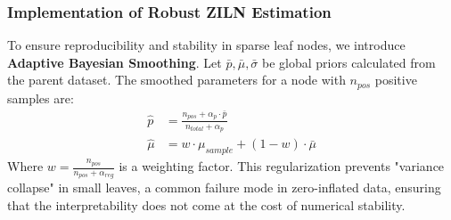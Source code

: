 \documentclass[runningheads]{llncs}
\begin{document}
\subsubsection{Implementation of Robust ZILN Estimation}
To ensure reproducibility and stability in sparse leaf nodes, we introduce \textbf{Adaptive Bayesian Smoothing}.
Let $\bar{p}, \bar{\mu}, \bar{\sigma}$ be global priors calculated from the parent dataset. The smoothed parameters for a node with $n_{pos}$ positive samples are:
\begin{align}
    \hat{p} &= \frac{n_{pos} + \alpha_p \cdot \bar{p}}{n_{total} + \alpha_p} \\
    \hat{\mu} &= w \cdot \mu_{sample} + (1-w) \cdot \bar{\mu}
\end{align}
Where $w = \frac{n_{pos}}{n_{pos} + \alpha_{reg}}$ is a weighting factor. This regularization prevents "variance collapse" in small leaves, a common failure mode in zero-inflated data, ensuring that the interpretability does not come at the cost of numerical stability.
\end{document}
